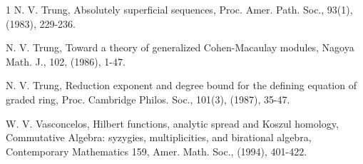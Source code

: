 \documentclass[11pt,reqno]{amsart}
\theoremstyle{definition}
\newcommand{\m}{\mathfrak m}
\numberwithin{equation}{section}
\begin{document}
\begin{thebibliography}{1}
 N. V. Trung,  Absolutely superficial sequences, Proc. Amer. Path. Soc., 93(1), (1983), 229-236.

 N. V. Trung, Toward a theory of generalized Cohen-Macaulay modules, Nagoya Math. J., 102, (1986), 1-47. 

 N. V. Trung,  Reduction exponent and degree bound for the defining equation of graded ring, Proc. Cambridge Philos. Soc., 101(3), (1987), 35-47.

 W. V. Vasconcelos,  Hilbert functions, analytic spread and Koszul homology, Commutative Algebra:
syzygies, multiplicities, and birational algebra, Contemporary Mathematics 159, Amer. Math. Soc., (1994), 401-422.




\end{thebibliography}
\end{document}
